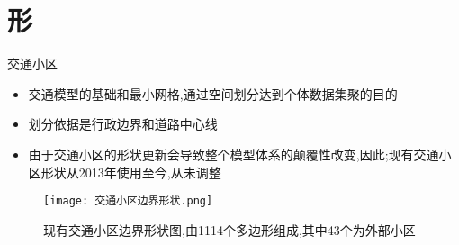 \documentclass{beamerthemeMono}
\begin{document}
\section{形}
\begin{frame}[t]{交通小区}
\begin{itemize}
\item<1-> 交通模型的基础和最小网格,通过空间划分达到个体数据集聚的目的
\item<2-> 划分依据是行政边界和道路中心线
\item<3-> 由于交通小区的形状更新会导致整个模型体系的颠覆性改变,因此;现有交通小区形状从2013年使用至今,从未调整
\end{itemize}

\begin{figure}[ht]
  \centering
  \texttt{[image: 交通小区边界形状.png]}
  \caption{现有交通小区边界形状图,由1114个多边形组成,其中43个为外部小区}
\end{figure}
\end{frame}
\end{document}
